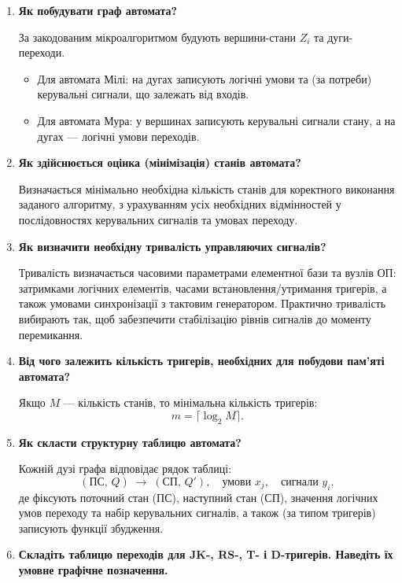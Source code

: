 \documentclass[12pt,a4paper]{article}
\begin{document}
\begin{enumerate}
        \item \textbf{Як побудувати граф автомата?}

        За закодованим мікроалгоритмом будують вершини-стани $Z_i$ та дуги-переходи.
        \begin{itemize}
            \item Для автомата Мілі: на дугах записують логічні умови та (за потреби) керувальні сигнали, що залежать від входів.
            \item Для автомата Мура: у вершинах записують керувальні сигнали стану, а на дугах --- логічні умови переходів.
        \end{itemize}

        \item \textbf{Як здійснюється оцінка (мінімізація) станів автомата?}

        Визначається мінімально необхідна кількість станів для коректного виконання заданого алгоритму,
        з урахуванням усіх необхідних відмінностей у послідовностях керувальних сигналів та умовах переходу.

        \item \textbf{Як визначити необхідну тривалість управляючих сигналів?}

        Тривалість визначається часовими параметрами елементної бази та вузлів ОП:
        затримками логічних елементів, часами встановлення/утримання тригерів, а також умовами синхронізації з тактовим генератором.
        Практично тривалість вибирають так, щоб забезпечити стабілізацію рівнів сигналів до моменту перемикання.

        \item \textbf{Від чого залежить кількість тригерів, необхідних для побудови пам'яті автомата?}

        Якщо $M$ --- кількість станів, то мінімальна кількість тригерів:
        \[
            m = \lceil \log_2 M \rceil.
        \]

        \item \textbf{Як скласти структурну таблицю автомата?}

        Кожній дузі графа відповідає рядок таблиці:
        \[
            (\text{ПС},\, Q)\;\rightarrow\;(\text{СП},\, Q'), \quad \text{умови } x_j,\quad \text{сигнали } y_i,
        \]
        де фіксують поточний стан (ПС), наступний стан (СП), значення логічних умов переходу та набір керувальних сигналів,
        а також (за типом тригерів) записують функції збудження.

        \item \textbf{Складіть таблицю переходів для JK-, RS-, T- і D-тригерів. Наведіть їх умовне графічне позначення.}


\end{enumerate}
\end{document}
